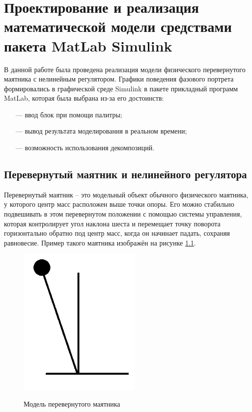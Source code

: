 \chapter{Проектирование и реализация математической модели средствами пакета MatLab Simulink}

В данной работе была проведена реализация модели физического перевернутого маятника с нелинейным регулятором. Графики поведения  фазового портрета формировались в графической среде Simulink в пакете прикладный программ MatLab, которая была выбрана из-за его достоинств:
\begin{enumerate}
\item[—] ввод блок при помощи палитры;
\item[—] вывод результата моделирования в реальном времени;
\item[—] возможность использования декомпозиций.
\end{enumerate}

\section{Перевернутый маятник и нелинейного регулятора }

Перевернутый маятник -- это модельный объект обычного физического маятника, у которого центр масс расположен выше точки опоры. Его можно стабильно подвешивать в этом перевернутом положении с помощью системы управления, которая контролирует угол наклона шеста и перемещает точку поворота горизонтально обратно под центр масс, когда он начинает падать, сохраняя равновесие. Пример такого маятника изображён на рисунке \ref{fig:10}.

\begin{figure}[h!]
\begin{center}
\includegraphics[angle=0,width=6cm]{fig/02.png}\\[2mm]
\caption{Модель перевернутого маятника}\label{fig:10}
\end{center}
\end{figure}


